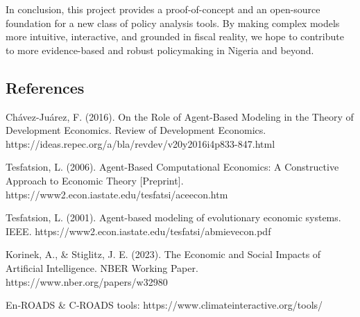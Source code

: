 \documentclass[
]{article}
\begin{document}
In conclusion, this project provides a proof-of-concept and an
open-source foundation for a new class of policy analysis tools. By
making complex models more intuitive, interactive, and grounded in
fiscal reality, we hope to contribute to more evidence-based and robust
policymaking in Nigeria and beyond.

\subsection{References}\label{references}

Chávez-Juárez, F. (2016). On the Role of Agent-Based Modeling in the
Theory of Development Economics. Review of Development Economics.
https://ideas.repec.org/a/bla/revdev/v20y2016i4p833-847.html

Tesfatsion, L. (2006). Agent-Based Computational Economics: A
Constructive Approach to Economic Theory {[}Preprint{]}.
https://www2.econ.iastate.edu/tesfatsi/aceecon.htm

Tesfatsion, L. (2001). Agent-based modeling of evolutionary economic
systems. IEEE. https://www2.econ.iastate.edu/tesfatsi/abmievecon.pdf

Korinek, A., \& Stiglitz, J. E. (2023). The Economic and Social Impacts
of Artificial Intelligence. NBER Working Paper.
https://www.nber.org/papers/w32980

En‑ROADS \& C‑ROADS tools: https://www.climateinteractive.org/tools/
\end{document}

